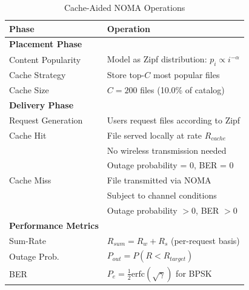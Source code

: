 \begin{table}[h]
\centering
\caption{Cache-Aided NOMA Operations}
\label{tab:cache_ops}
\begin{tabular}{|l|p{8cm}|}
\hline
\textbf{Phase} & \textbf{Operation} \\
\hline
\textbf{Placement Phase} & \\
Content Popularity & Model as Zipf distribution: $p_i \propto i^{-\alpha}$ \\
Cache Strategy & Store top-$C$ most popular files \\
Cache Size & $C = 200$ files (10.0\% of catalog) \\
\hline
\textbf{Delivery Phase} & \\
Request Generation & Users request files according to Zipf \\
Cache Hit & File served locally at rate $R_{cache}$ \\
            & No wireless transmission needed \\
            & Outage probability = 0, BER = 0 \\
\hline
Cache Miss & File transmitted via NOMA \\
           & Subject to channel conditions \\
           & Outage probability $> 0$, BER $> 0$ \\
\hline
\textbf{Performance Metrics} & \\
Sum-Rate & $R_{sum} = R_w + R_s$ (per-request basis) \\
Outage Prob. & $P_{out} = P(R < R_{target})$ \\
BER & $P_e = \frac{1}{2}\text{erfc}(\sqrt{\gamma})$ for BPSK \\
\hline
\end{tabular}
\end{table}

